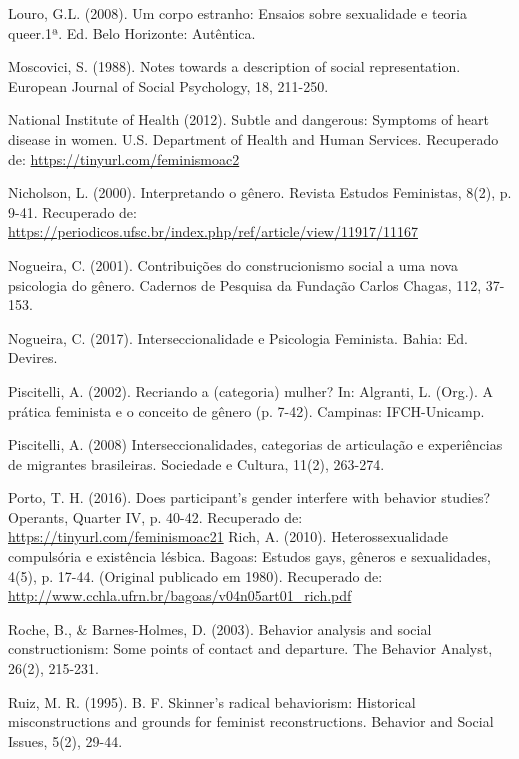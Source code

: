 \hangindent=25pt
\noindent Louro, G.L. (2008). Um corpo estranho: Ensaios sobre sexualidade e teoria queer.1ª. Ed. Belo Horizonte: Autêntica.

\hangindent=25pt
\noindent Moscovici, S. (1988). Notes towards a description of social representation. European Journal of Social Psychology, 18, 211-250. 

\hangindent=25pt
\noindent National Institute of Health (2012). Subtle and dangerous: Symptoms of heart disease in women. U.S. Department of Health and Human Services. Recuperado de: \url{https://tinyurl.com/feminismoac2}

\hangindent=25pt
\noindent Nicholson, L. (2000). Interpretando o gênero. Revista Estudos Feministas, 8(2), p. 9-41. Recuperado de: \url{https://periodicos.ufsc.br/index.php/ref/article/view/11917/11167}

\hangindent=25pt
\noindent Nogueira, C. (2001). Contribuições do construcionismo social a uma nova psicologia do gênero. Cadernos de Pesquisa da Fundação Carlos Chagas, 112, 37-153.

\hangindent=25pt
\noindent Nogueira, C. (2017). Interseccionalidade e Psicologia Feminista. Bahia: Ed. Devires. 

\hangindent=25pt
\noindent Piscitelli, A. (2002). Recriando a (categoria) mulher? In: Algranti, L. (Org.). A prática feminista e o conceito de gênero (p. 7-42). Campinas: IFCH-Unicamp.

\hangindent=25pt
\noindent Piscitelli, A. (2008) Interseccionalidades, categorias de articulação e experiências de migrantes brasileiras. Sociedade e Cultura, 11(2), 263-274.

\hangindent=25pt
\noindent Porto, T. H. (2016). Does participant’s gender interfere with behavior studies? Operants, Quarter IV, p. 40-42. Recuperado de: \url{https://tinyurl.com/feminismoac21}
Rich, A. (2010). Heterossexualidade compulsória e existência lésbica. Bagoas: Estudos gays, gêneros e sexualidades, 4(5), p. 17-44. (Original publicado em 1980). Recuperado de: \url{http://www.cchla.ufrn.br/bagoas/v04n05art01_rich.pdf}

\hangindent=25pt
\noindent Roche, B., \& Barnes-Holmes, D. (2003). Behavior analysis and social constructionism: Some points of contact and departure. The Behavior Analyst, 26(2), 215-231. 

\hangindent=25pt
\noindent Ruiz, M. R. (1995). B. F. Skinner’s radical behaviorism: Historical misconstructions and grounds for feminist reconstructions. Behavior and Social Issues, 5(2), 29-44. 

